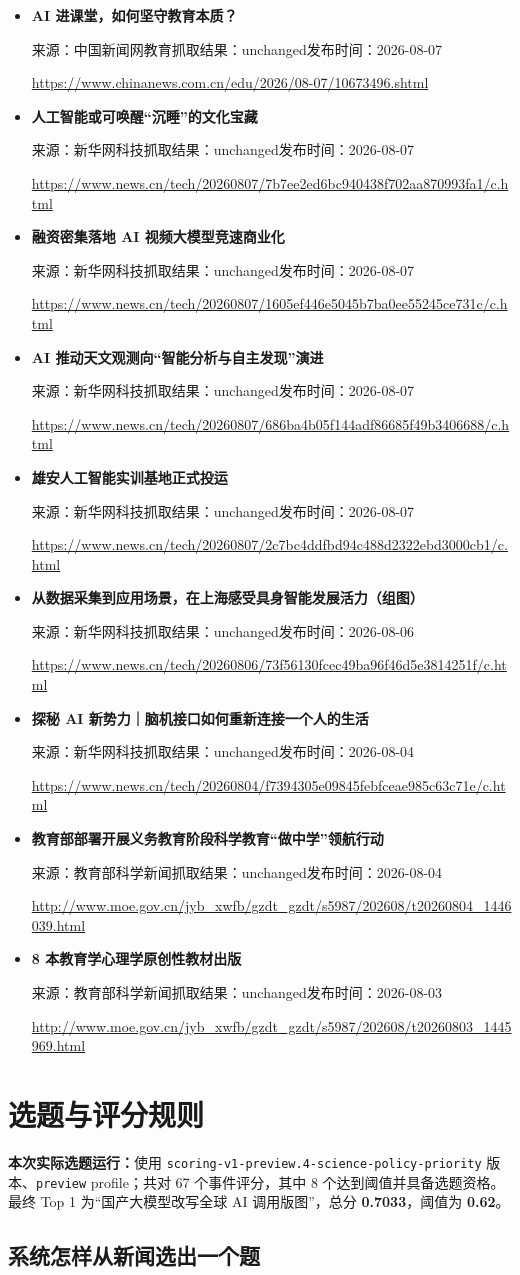 \documentclass[UTF8,11pt,a4paper,fontset=none]{ctexart}
\newcommand{\newsitem}[5]{%
  \item \textbf{#1}\par
  {\small\textcolor{slate}{来源：#2\quad 抓取结果：#3\quad 发布时间：#4}}\par
  {\footnotesize\url{#5}}
}
\begin{document}
\begin{itemize}[leftmargin=1.6em,itemsep=0.8em,topsep=0.3em]
\newsitem{AI 进课堂，如何坚守教育本质？}{中国新闻网教育}{unchanged}{2026-08-07}{https://www.chinanews.com.cn/edu/2026/08-07/10673496.shtml}
\newsitem{人工智能或可唤醒“沉睡”的文化宝藏}{新华网科技}{unchanged}{2026-08-07}{https://www.news.cn/tech/20260807/7b7ee2ed6bc940438f702aa870993fa1/c.html}
\newsitem{融资密集落地 AI 视频大模型竞速商业化}{新华网科技}{unchanged}{2026-08-07}{https://www.news.cn/tech/20260807/1605ef446e5045b7ba0ee55245ce731c/c.html}
\newsitem{AI 推动天文观测向“智能分析与自主发现”演进}{新华网科技}{unchanged}{2026-08-07}{https://www.news.cn/tech/20260807/686ba4b05f144adf86685f49b3406688/c.html}
\newsitem{雄安人工智能实训基地正式投运}{新华网科技}{unchanged}{2026-08-07}{https://www.news.cn/tech/20260807/2c7bc4ddfbd94c488d2322ebd3000cb1/c.html}
\newsitem{从数据采集到应用场景，在上海感受具身智能发展活力（组图）}{新华网科技}{unchanged}{2026-08-06}{https://www.news.cn/tech/20260806/73f56130fcec49ba96f46d5e3814251f/c.html}
\newsitem{探秘 AI 新势力｜脑机接口如何重新连接一个人的生活}{新华网科技}{unchanged}{2026-08-04}{https://www.news.cn/tech/20260804/f7394305e09845febfceae985c63c71e/c.html}
\newsitem{教育部部署开展义务教育阶段科学教育“做中学”领航行动}{教育部科学新闻}{unchanged}{2026-08-04}{http://www.moe.gov.cn/jyb_xwfb/gzdt_gzdt/s5987/202608/t20260804_1446039.html}
\newsitem{8 本教育学心理学原创性教材出版}{教育部科学新闻}{unchanged}{2026-08-03}{http://www.moe.gov.cn/jyb_xwfb/gzdt_gzdt/s5987/202608/t20260803_1445969.html}
\end{itemize}

\section{选题与评分规则}

\begin{infobox}
\textbf{本次实际选题运行：}使用 \texttt{scoring-v1-preview.4-science-policy-priority} 版本、\texttt{preview} profile；共对 67 个事件评分，其中 8 个达到阈值并具备选题资格。最终 Top 1 为“国产大模型改写全球 AI 调用版图”，总分 \textbf{0.7033}，阈值为 \textbf{0.62}。
\end{infobox}

\subsection{系统怎样从新闻选出一个题}
\end{document}

